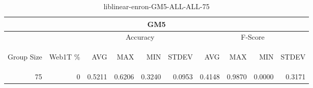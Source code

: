 \begin{center}
\begin{table}[htbp]
\begin{tabular}{ | r | r | r | r | r | r | r | r | r | r |}
\hline
\multicolumn{10}{|c|}{GM5}\\
\hline
 & & \multicolumn{4}{|c|}{Accuracy} & \multicolumn{4}{|c|}{F-Score}\\ \cline{3-10}
\begin{sideways}Group Size\end{sideways} & \begin{sideways}Web1T \%\end{sideways} & \begin{sideways}AVG\end{sideways} & \begin{sideways}MAX\end{sideways} & \begin{sideways}MIN\end{sideways} & \begin{sideways}STDEV\end{sideways} & \begin{sideways}AVG\end{sideways} & \begin{sideways}MAX\end{sideways} & \begin{sideways}MIN\end{sideways} & \begin{sideways}STDEV\end{sideways}\\
\hline
\multirow{0}{*}{75}
 & 0 & 0.5211 & 0.6206 & 0.3240 & 0.0953 & 0.4148 & 0.9870 & 0.0000 & 0.3171\\ \cline{2-10}
\hline
\end{tabular}
\caption{liblinear-enron-GM5-ALL-ALL-75}
\label{table:liblinear-enron-GM5-ALL-ALL-75}
\end{table}
\end{center}

